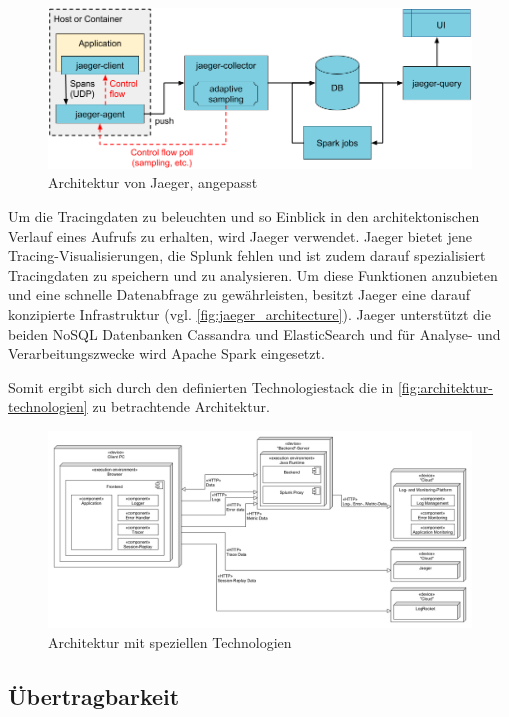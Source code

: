 \begin{figure}
\centering
\includegraphics[width=\linewidth]{img/04_erstellung-poc/jaeger_architecture-v1_edited.png}
\caption{Architektur von Jaeger, angepasst \cite{JaegerArchitecture}}
\label{fig:jaeger_architecture}
\end{figure}
	
	Um die Tracingdaten zu beleuchten und so Einblick in den architektonischen Verlauf eines Aufrufs zu erhalten, wird Jaeger verwendet. Jaeger bietet jene Tracing-Visualisierungen, die Splunk fehlen und ist zudem darauf spezialisiert Tracingdaten zu speichern und zu analysieren. Um diese Funktionen anzubieten und eine schnelle Datenabfrage zu gewährleisten, besitzt Jaeger eine darauf konzipierte Infrastruktur (vgl. \autoref{fig:jaeger_architecture}). Jaeger unterstützt die beiden NoSQL Datenbanken Cassandra und ElasticSearch und für Analyse- und Verarbeitungszwecke wird Apache Spark eingesetzt.
	
	Somit ergibt sich durch den definierten Technologiestack die in \autoref{fig:architektur-technologien} zu betrachtende Architektur.
	
\begin{figure}[H]
	\centering
	\includegraphics[width=0.75\linewidth]{img/04_erstellung-poc/konzept-technologien.png}
	\caption{Architektur mit speziellen Technologien}
	\label{fig:architektur-technologien}
\end{figure}

	\subsection{Übertragbarkeit}
	
